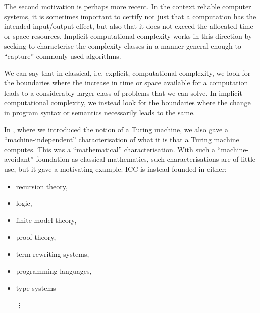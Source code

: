

The second motivation is perhaps more recent. In the context reliable computer
systems, it is sometimes important to certify not just that a computation has
the intended input/output effect, but also that it does not exceed the
allocated time or space resources. Implicit computational complexity works in
this direction by seeking to characterise the complexity classes in a manner
general enough to ``capture'' commonly used algorithms.

We can say that in classical, i.e. explicit, computational complexity, we look
for the boundaries where the increase in time or space available for a
computation leads to a considerably larger class of problems that we can solve.
In implicit computational complexity, we instead look for the boundaries where
the change in program syntax or semantics necessarily leads to the same.

In , where we introduced the notion of a Turing machine,
we also gave a ``machine-independent'' characterisation of what it is that a
Turing machine computes. This was a ``mathematical'' characterisation. With
such a ``machine-avoidant'' foundation as classical mathematics, such
characterisations are of little use, but it gave a motivating example. ICC is
instead founded in either:

\begin{itemize}

\item recursion theory\cite{cobham-1965, clote-1990,
bellantoni-cook-1992, leivant-1995, ishihara-1999, kristiansen-2005,
marion-2009},

\item logic\cite{fagin-1974,immerman},

\item finite model theory\cite{?},

\item proof theory\cite{girard-scedorov-scott-1992, leivant-1994, girard-1998,
asperti-roversi-2002, lafont-2004, dal-lago-hofmann-2010},

\item term rewriting
systems\cite{beckmann-weiermann-1996, bonfante-et-al-1999, avanzini-et-al-2012,
de-carvalho-simonsen-2014},

\item programming languages\cite{voda-1994, jones-1999,
kristiansen-niggl-2004, kristiansen-voda-2005, niggl-wunderlich-2006},

\item type systems\cite{hofmann-2000b, crary-weirich-2000,
bellantoni-et-al-2000, hofmann-2003}

\hspace{-0.12in}\vdots

\end{itemize}

